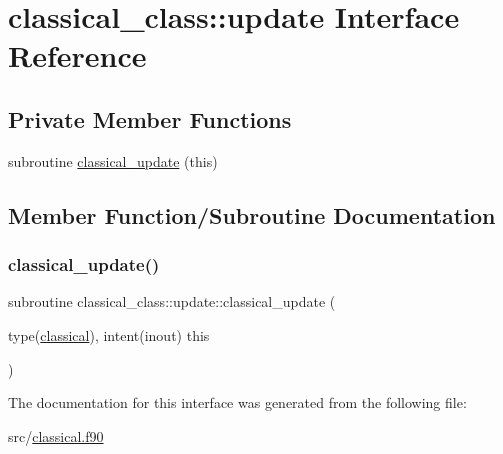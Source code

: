 \hypertarget{interfaceclassical__class_1_1update}{}\section{classical\+\_\+class\+:\+:update Interface Reference}
\label{interfaceclassical__class_1_1update}
\subsection*{Private Member Functions}
\begin{DoxyCompactItemize}
\item 
subroutine \hyperlink{interfaceclassical__class_1_1update_a65e6716bd77fe976cc4fae8b5057cc7d}{classical\+\_\+update} (this)
\end{DoxyCompactItemize}


\subsection{Member Function/\+Subroutine Documentation}
\mbox{\label{interfaceclassical__class_1_1update_a65e6716bd77fe976cc4fae8b5057cc7d}} 
\subsubsection{\texorpdfstring{classical\+\_\+update()}{classical\_update()}}
{\footnotesize\ttfamily subroutine classical\+\_\+class\+::update\+::classical\+\_\+update (\begin{DoxyParamCaption}\item[{type(\hyperlink{structclassical__class_1_1classical}{classical}), intent(inout)}]{this }\end{DoxyParamCaption})\hspace{0.3cm}{\ttfamily [private]}}



The documentation for this interface was generated from the following file\+:\begin{DoxyCompactItemize}
\item 
src/\hyperlink{classical_8f90}{classical.\+f90}\end{DoxyCompactItemize}
